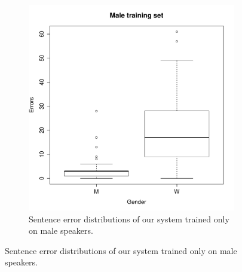 \documentclass[twocolumn, 11pt]{article}
\begin{document}
\begin{figure}[h]
  \begin{subfigure}{\columnwidth}
    \includegraphics[width=\columnwidth]{male_only.pdf}
    \caption{\label{fig:male} Sentence error distributions of our system trained only on male speakers.}
  \end{subfigure}
\end{figure}
\end{document}
